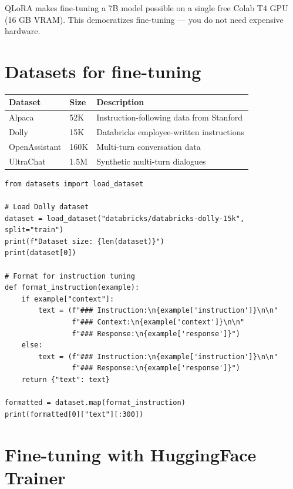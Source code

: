 \begin{aitip}
QLoRA makes fine-tuning a 7B model possible on a single free Colab T4 GPU (16 GB VRAM). This democratizes fine-tuning --- you do not need expensive hardware.
\end{aitip}

\section{Datasets for fine-tuning}

\begin{longtable}{p{3cm}p{3cm}p{6.5cm}}
\toprule
\textbf{Dataset} & \textbf{Size} & \textbf{Description} \\
\midrule
Alpaca & 52K & Instruction-following data from Stanford \\
Dolly & 15K & Databricks employee-written instructions \\
OpenAssistant & 160K & Multi-turn conversation data \\
UltraChat & 1.5M & Synthetic multi-turn dialogues \\
\bottomrule
\end{longtable}

\begin{verbatim}
from datasets import load_dataset

# Load Dolly dataset
dataset = load_dataset("databricks/databricks-dolly-15k", split="train")
print(f"Dataset size: {len(dataset)}")
print(dataset[0])

# Format for instruction tuning
def format_instruction(example):
    if example["context"]:
        text = (f"### Instruction:\n{example['instruction']}\n\n"
                f"### Context:\n{example['context']}\n\n"
                f"### Response:\n{example['response']}")
    else:
        text = (f"### Instruction:\n{example['instruction']}\n\n"
                f"### Response:\n{example['response']}")
    return {"text": text}

formatted = dataset.map(format_instruction)
print(formatted[0]["text"][:300])
\end{verbatim}

\section{Fine-tuning with HuggingFace Trainer}

